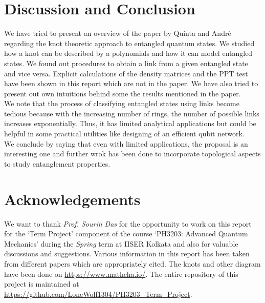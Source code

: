 \documentclass{scrartcl}
\begin{document}
\section{Discussion and Conclusion}
We have tried to present an overview of the paper by Quinta and André regarding the knot theoretic approach to entangled quantum states. We studied how a knot can be described by a polynomials and how it can model entangled states. We found out procedures to obtain a link from a given entangled state and vice versa. Explicit calculations of the density matrices and the PPT test have been shown in this report which are not in the paper. We have also tried to present out own intuitions behind some the results mentioned in the paper.\\[0.3cm]
We note that the process of classifying entangled states using links become tedious because with the increasing number of rings, the number of possible links increases exponentially. Thus, it has limited analytical applications but could be helpful in some practical utilities like designing of an efficient qubit network. \\[0.3cm]
We conclude by saying that even with limited applications, the proposal is an interesting one and further wrok has been done to incorporate topological aspects to study entanglement properties. 
\section{Acknowledgements}
We want to thank \textit{Prof. Sourin Das} for the opportunity to work on this report for the `Term Project' component of the course `PH3203: Advanced Quantum Mechanics' during the \textit{Spring} term at IISER Kolkata and also for valuable discussions and suggestions. Various information in this report has been taken from different papers which are appropriately cited. The knots and other diagram have been done on \url{https://www.mathcha.io/}.  The entire repository of this project is maintained at \url{https://github.com/LoneWolf1304/PH3203_Term_Project}.
\newpage
\end{document}
